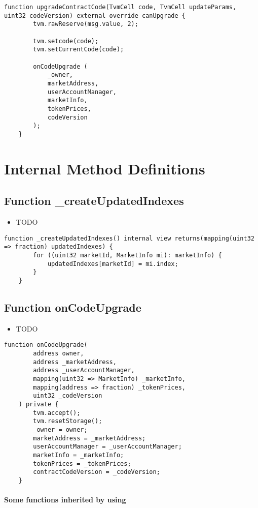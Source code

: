 \begin{lstlisting}[firstnumber=25]
    function upgradeContractCode(TvmCell code, TvmCell updateParams, uint32 codeVersion) external override canUpgrade {
        tvm.rawReserve(msg.value, 2);

        tvm.setcode(code);
        tvm.setCurrentCode(code);

        onCodeUpgrade (
            _owner,
            marketAddress,
            userAccountManager,
            marketInfo,
            tokenPrices,
            codeVersion
        );
    }
\end{lstlisting}

\section{Internal Method Definitions}


\subsection{Function \_{}createUpdatedIndexes}

\noindent\begin{itemize}
\item TODO
\end{itemize}

\begin{lstlisting}[firstnumber=103]
    function _createUpdatedIndexes() internal view returns(mapping(uint32 => fraction) updatedIndexes) {
        for ((uint32 marketId, MarketInfo mi): marketInfo) {
            updatedIndexes[marketId] = mi.index;
        }
    }
\end{lstlisting}

\subsection{Function onCodeUpgrade}

\noindent\begin{itemize}
\item TODO
\end{itemize}

\begin{lstlisting}[firstnumber=41]
    function onCodeUpgrade(
        address owner,
        address _marketAddress,
        address _userAccountManager,
        mapping(uint32 => MarketInfo) _marketInfo,
        mapping(address => fraction) _tokenPrices,
        uint32 _codeVersion
    ) private {
        tvm.accept();
        tvm.resetStorage();
        _owner = owner;
        marketAddress = _marketAddress;
        userAccountManager = _userAccountManager;
        marketInfo = _marketInfo;
        tokenPrices = _tokenPrices;
        contractCodeVersion = _codeVersion;
    }
\end{lstlisting}
\paragraph{Some functions inherited by using}
